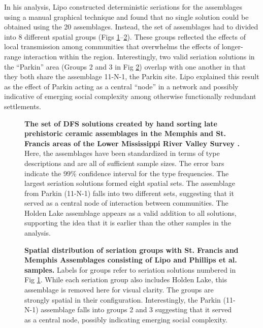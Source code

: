 \documentclass[10pt,letterpaper]{article}
\begin{document}
In his analysis, Lipo \cite{Lipo2001a,Lipo2008} constructed deterministic seriations for the assemblages using a manual graphical technique and found that no single solution could be obtained using the 20 assemblages. Instead, the set of assemblages had to divided into 8 different spatial groups (Figs \ref{fig9}--\ref{fig10}). These groups reflected the effects of local transmission among communities that overwhelms the effects of longer-range interaction within the region. Interestingly, two valid seriation solutions in the “Parkin” area (Groups 2 and 3 in Fig \ref{fig10}) overlap with one another in that they both share the assemblage 11-N-1, the Parkin site. Lipo \cite{Lipo2001a} explained this result as the effect of Parkin acting as a central “node” in a network and possibly indicative of emerging social complexity among otherwise functionally redundant settlements. 

\begin{figure}[h]
\caption{{\bf The set of DFS solutions created by hand sorting late prehistoric ceramic assemblages in the Memphis and St. Francis areas of the Lower Mississippi River Valley Survey \cite{Phillips1951,Lipo2001a}.} Here, the assemblages have been standardized in terms of type descriptions and are all of sufficient sample sizes. The error bars indicate the 99\% confidence interval for the type frequencies. The largest seriation solutions formed eight spatial sets. The assemblage from Parkin (11-N-1) falls into two different sets, suggesting that it served as a central node of interaction between communities. The Holden Lake assemblage appears as a valid addition to all solutions, supporting the idea that it is earlier than the other samples in the analysis.}
\label{fig9}
\end{figure}

\begin{figure}[h]
\caption{{\bf Spatial distribution of seriation groups with St. Francis and Memphis Assemblages consisting of Lipo \cite{Lipo2000} and Phillips et al. \cite{Phillips1951} samples.} Labels for groups refer to seriation solutions numbered in Fig \ref{fig9}. While each seriation group also includes Holden Lake, this assemblage is removed here for visual clarity. The groups are strongly spatial in their configuration. Interestingly, the Parkin (11-N-1) assemblage falls into groups 2 and 3 suggesting that it served as a central node, possibly indicating emerging social complexity. }
\label{fig10}
\end{figure}
\end{document}
